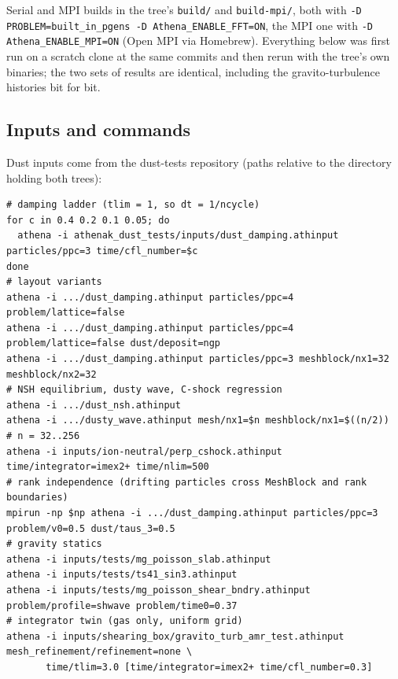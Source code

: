 \documentclass[11pt]{article}
\newcommand{\code}[1]{\texttt{#1}}
\newcommand{\file}[1]{\texttt{#1}}
\begin{document}
Serial and MPI builds in the tree's \file{build/} and \file{build-mpi/}, both with
\code{-D PROBLEM=built\_in\_pgens -D Athena\_ENABLE\_FFT=ON}, the MPI one with
\code{-D Athena\_ENABLE\_MPI=ON} (Open MPI via Homebrew). Everything below was first
run on a scratch clone at the same commits and then rerun with the tree's own
binaries; the two sets of results are identical, including the gravito-turbulence
histories bit for bit.

\subsection{Inputs and commands}

Dust inputs come from the dust-tests repository (paths relative to the directory
holding both trees):

\begin{lstlisting}
# damping ladder (tlim = 1, so dt = 1/ncycle)
for c in 0.4 0.2 0.1 0.05; do
  athena -i athenak_dust_tests/inputs/dust_damping.athinput particles/ppc=3 time/cfl_number=$c
done
# layout variants
athena -i .../dust_damping.athinput particles/ppc=4 problem/lattice=false
athena -i .../dust_damping.athinput particles/ppc=4 problem/lattice=false dust/deposit=ngp
athena -i .../dust_damping.athinput particles/ppc=3 meshblock/nx1=32 meshblock/nx2=32
# NSH equilibrium, dusty wave, C-shock regression
athena -i .../dust_nsh.athinput
athena -i .../dusty_wave.athinput mesh/nx1=$n meshblock/nx1=$((n/2))     # n = 32..256
athena -i inputs/ion-neutral/perp_cshock.athinput time/integrator=imex2+ time/nlim=500
# rank independence (drifting particles cross MeshBlock and rank boundaries)
mpirun -np $np athena -i .../dust_damping.athinput particles/ppc=3 problem/v0=0.5 dust/taus_3=0.5
# gravity statics
athena -i inputs/tests/mg_poisson_slab.athinput
athena -i inputs/tests/ts41_sin3.athinput
athena -i inputs/tests/mg_poisson_shear_bndry.athinput problem/profile=shwave problem/time0=0.37
# integrator twin (gas only, uniform grid)
athena -i inputs/shearing_box/gravito_turb_amr_test.athinput mesh_refinement/refinement=none \
       time/tlim=3.0 [time/integrator=imex2+ time/cfl_number=0.3]
\end{lstlisting}
\end{document}

